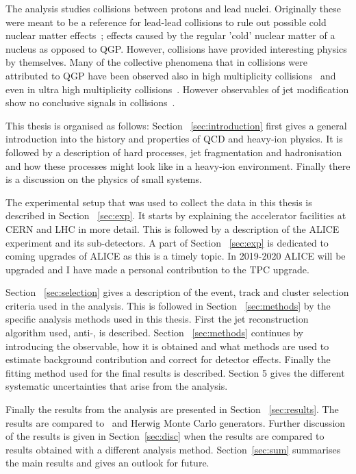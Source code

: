 The analysis studies collisions between protons and lead nuclei. Originally these were meant to be a reference for lead-lead collisions to rule out possible cold nuclear matter effects~\cite{Connors:2017ptx}; effects caused by the regular 'cold' nuclear matter of a nucleus as opposed to QGP. However, \pPb collisions have provided interesting physics by themselves. Many of the collective phenomena that in \PbPb collisions were attributed to QGP have been observed also in high multiplicity \pPb collisions~\cite{Nagle:2018nvi} and even in ultra high multiplicity \pp collisions~\cite{Nagle:2018nvi}. However observables of jet modification show no conclusive signals in \pPb collisions~\cite{Connors:2017ptx,Nagle:2018nvi}.

This thesis is organised as follows: Section ~\ref{sec:introduction} first gives a general introduction into the history and properties of QCD and heavy-ion physics. It is followed by a description of hard processes, jet fragmentation and hadronisation and how these processes might look like in a heavy-ion environment. Finally there is a discussion on the physics of small systems.

The experimental setup that was used to collect the data in this thesis is described in Section ~\ref{sec:exp}. It starts by explaining the accelerator facilities at CERN and LHC in more detail. This is followed by a description of the ALICE experiment and its sub-detectors. A part of Section ~\ref{sec:exp} is dedicated to coming upgrades of ALICE as this is a timely topic. In 2019-2020 ALICE will be upgraded and I have made a personal contribution to the TPC upgrade.

Section ~\ref{sec:selection} gives a description of the event, track and cluster selection criteria used in the analysis. This is followed in Section ~\ref{sec:methods} by the specific analysis methods used in this thesis. First the jet reconstruction algorithm used, anti-\kt{}, is described. Section ~\ref{sec:methods} continues by introducing the \jt{} observable, how it is obtained and what methods are used to estimate background contribution and correct for detector effects. Finally the fitting method used for the final results is described. Section 5 gives the different systematic uncertainties that arise from the analysis.

Finally the results from the analysis are presented in Section ~\ref{sec:results}. The results are compared to \pythia~and Herwig Monte Carlo generators. Further discussion of the results is given in Section~\ref{sec:disc} when the results are compared to \jt{} results obtained with a different analysis method. Section~\ref{sec:sum} summarises the main results and gives an outlook for future.


